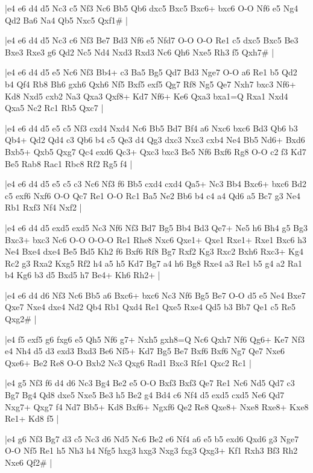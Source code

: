 \whitename{}
\blackname{}
\makegametitle
|e4 e6 d4 d5 Nc3 c5 Nf3 Nc6 Bb5 Qb6 dxc5 Bxc5 Bxc6+ bxc6 O-O Nf6 e5 Ng4 Qd2 Ba6 Na4 Qb5 Nxc5 Qxf1\#  |

\whitename{}
\blackname{}
\makegametitle
|e4 e6 d4 d5 Nc3 c6 Nf3 Be7 Bd3 Nf6 e5 Nfd7 O-O O-O Re1 c5 dxc5 Bxc5 Be3 Bxe3 Rxe3 g6 Qd2 Nc5 Nd4 Nxd3 Rxd3 Nc6 Qh6 Nxe5 Rh3 f5 Qxh7\#  |

\whitename{}
\blackname{}
\makegametitle
|e4 e6 d4 d5 e5 Nc6 Nf3 Bb4+ c3 Ba5 Bg5 Qd7 Bd3 Nge7 O-O a6 Re1 b5 Qd2 b4 Qf4 Rb8 Bh6 gxh6 Qxh6 Nf5 Bxf5 exf5 Qg7 Rf8 Ng5 Qe7 Nxh7 bxc3 Nf6+ Kd8 Nxd5 cxb2 Na3 Qxa3 Qxf8+ Kd7 Nf6+ Ke6 Qxa3 bxa1=Q Rxa1 Nxd4 Qxa5 Nc2 Rc1 Rb5 Qxc7  |

\whitename{}
\blackname{}
\makegametitle
|e4 e6 d4 d5 e5 c5 Nf3 cxd4 Nxd4 Nc6 Bb5 Bd7 Bf4 a6 Nxc6 bxc6 Bd3 Qb6 b3 Qb4+ Qd2 Qd4 c3 Qb6 b4 c5 Qe3 d4 Qg3 dxc3 Nxc3 cxb4 Ne4 Bb5 Nd6+ Bxd6 Bxb5+ Qxb5 Qxg7 Qc4 exd6 Qc3+ Qxc3 bxc3 Be5 Nf6 Bxf6 Rg8 O-O c2 f3 Kd7 Be5 Rab8 Rac1 Rbc8 Rf2 Rg5 f4  |

\whitename{}
\blackname{}
\makegametitle
|e4 e6 d4 d5 e5 c5 c3 Nc6 Nf3 f6 Bb5 cxd4 cxd4 Qa5+ Nc3 Bb4 Bxc6+ bxc6 Bd2 c5 exf6 Nxf6 O-O Qc7 Re1 O-O Rc1 Ba5 Ne2 Bb6 b4 c4 a4 Qd6 a5 Bc7 g3 Ne4 Rb1 Rxf3 Nf4 Nxf2  |

\whitename{}
\blackname{}
\makegametitle
|e4 e6 d4 d5 exd5 exd5 Nc3 Nf6 Nf3 Bd7 Bg5 Bb4 Bd3 Qe7+ Ne5 h6 Bh4 g5 Bg3 Bxc3+ bxc3 Nc6 O-O O-O-O Re1 Rhe8 Nxc6 Qxe1+ Qxe1 Rxe1+ Rxe1 Bxc6 h3 Ne4 Bxe4 dxe4 Be5 Bd5 Kh2 f6 Bxf6 Rf8 Bg7 Rxf2 Kg3 Rxc2 Bxh6 Rxc3+ Kg4 Rc2 g3 Rxa2 Kxg5 Rf2 h4 a5 h5 Kd7 Bg7 a4 h6 Bg8 Rxe4 a3 Re1 b5 g4 a2 Ra1 b4 Kg6 b3 d5 Bxd5 h7 Be4+ Kh6 Rh2+  |

\whitename{}
\blackname{}
\makegametitle
|e4 e6 d4 d6 Nf3 Nc6 Bb5 a6 Bxc6+ bxc6 Nc3 Nf6 Bg5 Be7 O-O d5 e5 Ne4 Bxe7 Qxe7 Nxe4 dxe4 Nd2 Qb4 Rb1 Qxd4 Re1 Qxe5 Rxe4 Qd5 b3 Bb7 Qe1 c5 Re5 Qxg2\#  |

\whitename{}
\blackname{}
\makegametitle
|e4 f5 exf5 g6 fxg6 e5 Qh5 Nf6 g7+ Nxh5 gxh8=Q Nc6 Qxh7 Nf6 Qg6+ Ke7 Nf3 e4 Nh4 d5 d3 exd3 Bxd3 Be6 Nf5+ Kd7 Bg5 Be7 Bxf6 Bxf6 Ng7 Qe7 Nxe6 Qxe6+ Be2 Re8 O-O Bxb2 Nc3 Qxg6 Rad1 Bxc3 Rfe1 Qxc2 Rc1  |

\whitename{}
\blackname{}
\makegametitle
|e4 g5 Nf3 f6 d4 d6 Nc3 Bg4 Be2 e5 O-O Bxf3 Bxf3 Qe7 Re1 Nc6 Nd5 Qd7 c3 Bg7 Bg4 Qd8 dxe5 Nxe5 Be3 h5 Be2 g4 Bd4 c6 Nf4 d5 exd5 cxd5 Ne6 Qd7 Nxg7+ Qxg7 f4 Nd7 Bb5+ Kd8 Bxf6+ Ngxf6 Qe2 Re8 Qxe8+ Nxe8 Rxe8+ Kxe8 Re1+ Kd8 f5  |

\whitename{}
\blackname{}
\makegametitle
|e4 g6 Nf3 Bg7 d3 c5 Nc3 d6 Nd5 Nc6 Be2 e6 Nf4 a6 e5 b5 exd6 Qxd6 g3 Nge7 O-O Nf5 Re1 h5 Nh3 h4 Nfg5 hxg3 hxg3 Nxg3 fxg3 Qxg3+ Kf1 Rxh3 Bf3 Rh2 Nxe6 Qf2\#  |


